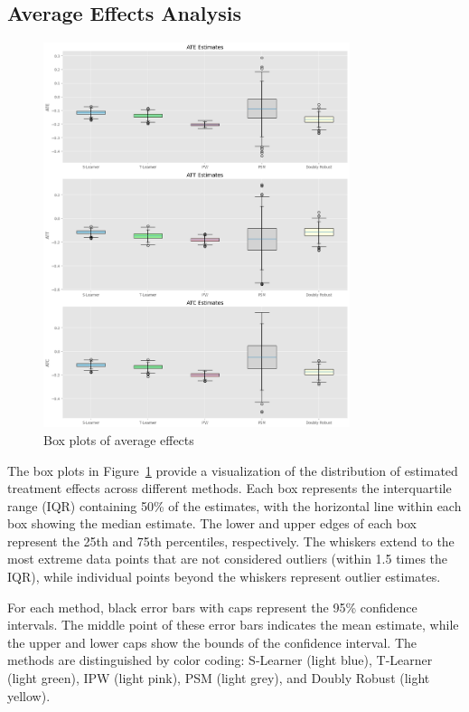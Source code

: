 \documentclass{article}
\begin{document}
\subsection{Average Effects Analysis}

\begin{figure}[h!]
    \centering
    \caption{Box plots of average effects}
    \label{fig:box_plots}
    \includegraphics[width = 0.8\textwidth]{plots/box_plots.png}
\end{figure}

The box plots in Figure~\ref{fig:box_plots} provide a visualization of the distribution of estimated treatment effects across different methods. Each box represents the interquartile range (IQR) containing 50\% of the estimates, with the horizontal line within each box showing the median estimate. The lower and upper edges of each box represent the 25th and 75th percentiles, respectively. The whiskers extend to the most extreme data points that are not considered outliers (within 1.5 times the IQR), while individual points beyond the whiskers represent outlier estimates.

For each method, black error bars with caps represent the 95\% confidence intervals. The middle point of these error bars indicates the mean estimate, while the upper and lower caps show the bounds of the confidence interval. The methods are distinguished by color coding: S-Learner (light blue), T-Learner (light green), IPW (light pink), PSM (light grey), and Doubly Robust (light yellow).
\end{document}
